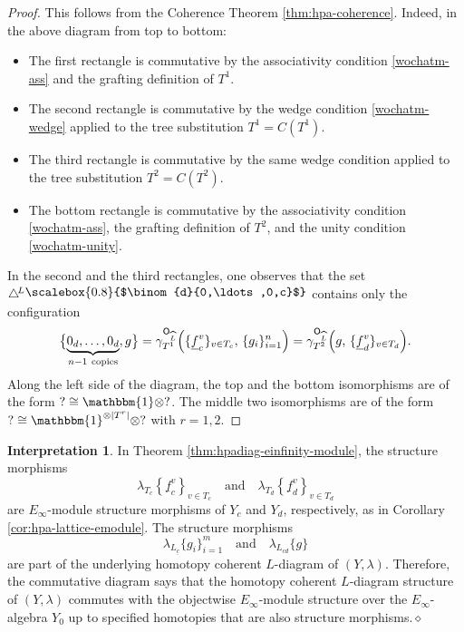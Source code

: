 \documentclass{amsbook}
\numberwithin{section}{chapter}
\numberwithin{subsection}{section}
\numberwithin{equation}{section}
\theoremstyle{plain}
\theoremstyle{definition}
\newtheorem{interpretation}[equation]{Interpretation}
\renewcommand{\O}{\mathsf{O}}
\newcommand{\tensorunit}{\mathbbm{1}}
\newcommand{\dqed}{\hfill$\diamond$}
\newcommand{\Config}{\triangle} %
\newcommand{\Configl}{\Config^{\! L}}
\newcommand{\Lhat}{\widehat{L}}
\newcommand{\Olhat}{\O_{\Lhat}}
\newcommand{\uc}{\underline c}
\newcommand{\uf}{\underline f}
\newcommand{\smallprof}[1]
{\raisebox{.05cm}{\scalebox{0.8}{#1}}}
\newcommand{\dzerozeroc}{\smallprof{$\binom{d}{0,\ldots,0,c}$}}
\newcommand{\andspace}{\quad\text{and}\quad}
\begin{document}
\begin{proof}
This follows from the Coherence Theorem \ref{thm:hpa-coherence}.  Indeed, in the above diagram from top to bottom:
\begin{itemize}\item The first rectangle is commutative by the associativity condition \eqref{wochatm-ass} and the grafting definition of $T^1$.
\item The second rectangle is commutative by the wedge condition \eqref{wochatm-wedge} applied to the tree substitution $T^1 = C(T^1)$.
\item The third rectangle is commutative by the same wedge condition applied to the tree substitution $T^2 = C(T^2)$.
\item The bottom rectangle is commutative by the associativity condition \eqref{wochatm-ass}, the grafting definition of $T^2$, and the unity condition \eqref{wochatm-unity}.
\end{itemize}
In the second and the third rectangles, one observes that the set $\Configl\dzerozeroc$ contains only the configuration \[\bigl\{\underbrace{0_d,\ldots, 0_d}_{n-1~\mathrm{copies}}, g\bigr\} = \gamma^{\Olhat}_{T^1}\Bigl(\{\uf^v_c\}_{v\in T_c},\, \{g_i\}_{i=1}^n\Bigr) = \gamma^{\Olhat}_{T^2}\Bigl(g,\,\{\uf^v_d\}_{v\in T_d}\Bigr).\] Along the left side of the diagram, the top and the bottom isomorphisms are of the form $? \cong \tensorunit \otimes ?$.  The middle two isomorphisms are of the form $? \cong \tensorunit^{\otimes |T^r|}\otimes ?$ with $r=1,2$.
\end{proof}

\begin{interpretation} In Theorem \ref{thm:hpadiag-einfinity-module}, the structure morphisms \[\lambda_{T_c}\left\{\uf^v_c\right\}_{v\in T_c} \andspace \lambda_{T_d}\left\{\uf^v_d\right\}_{v\in T_d}\] are $E_\infty$-module structure morphisms of $Y_c$ and $Y_d$, respectively, as in Corollary \ref{cor:hpa-lattice-emodule}.  The structure morphisms \[\lambda_{L_{\uc}}\{g_i\}_{i=1}^m \andspace \lambda_{L_{cd}}\{g\}\] are part of the underlying homotopy coherent $L$-diagram of $(Y,\lambda)$.  Therefore, the commutative diagram says that the homotopy coherent $L$-diagram structure of $(Y,\lambda)$ commutes with the objectwise $E_\infty$-module structure over the $E_\infty$-algebra $Y_0$ up to specified homotopies that are also structure morphisms.\dqed
\end{interpretation}
\end{document}
